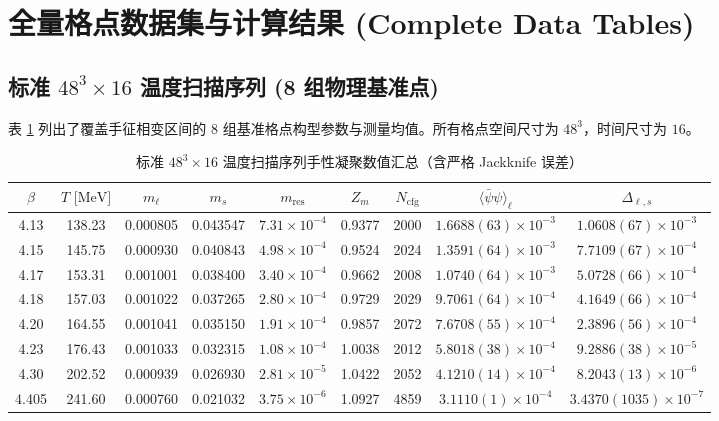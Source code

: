 \documentclass[11pt,a4paper]{ctexart}
\begin{document}
\section{全量格点数据集与计算结果 (Complete Data Tables)}

\subsection{\texorpdfstring{标准 $48^3 \times 16$ 温度扫描序列 (8 组物理基准点)}{标准 48^3 x 16 温度扫描序列 (8 组物理基准点)}}

表 \ref{tab:standard_ensembles} 列出了覆盖手征相变区间的 8 组基准格点构型参数与测量均值。所有格点空间尺寸为 $48^3$，时间尺寸为 $16$。

\begin{table}[H]
\centering
\footnotesize
\setlength{\tabcolsep}{3.5pt}
\caption{标准 $48^3 \times 16$ 温度扫描序列手性凝聚数值汇总（含严格 Jackknife 误差）}
\label{tab:standard_ensembles}
\begin{tabular}{ccccccccc}
\toprule
$\beta$ & $T\text{ [MeV]}$ & $m_\ell$ & $m_s$ & $m_{\text{res}}$ & $Z_m$ & $N_{\text{cfg}}$ & $\langle\bar{\psi}\psi\rangle_\ell$ & $\Delta_{\ell, s}$ \\
\midrule
4.13  & 138.23 & 0.000805 & 0.043547 & $7.31 \times 10^{-4}$ & 0.9377 & 2000 & $1.6688(63) \times 10^{-3}$ & $1.0608(67) \times 10^{-3}$ \\
4.15  & 145.75 & 0.000930 & 0.040843 & $4.98 \times 10^{-4}$ & 0.9524 & 2024 & $1.3591(64) \times 10^{-3}$ & $7.7109(67) \times 10^{-4}$ \\
4.17  & 153.31 & 0.001001 & 0.038400 & $3.40 \times 10^{-4}$ & 0.9662 & 2008 & $1.0740(64) \times 10^{-3}$ & $5.0728(66) \times 10^{-4}$ \\
4.18  & 157.03 & 0.001022 & 0.037265 & $2.80 \times 10^{-4}$ & 0.9729 & 2029 & $9.7061(64) \times 10^{-4}$ & $4.1649(66) \times 10^{-4}$ \\
4.20  & 164.55 & 0.001041 & 0.035150 & $1.91 \times 10^{-4}$ & 0.9857 & 2072 & $7.6708(55) \times 10^{-4}$ & $2.3896(56) \times 10^{-4}$ \\
4.23  & 176.43 & 0.001033 & 0.032315 & $1.08 \times 10^{-4}$ & 1.0038 & 2012 & $5.8018(38) \times 10^{-4}$ & $9.2886(38) \times 10^{-5}$ \\
4.30  & 202.52 & 0.000939 & 0.026930 & $2.81 \times 10^{-5}$ & 1.0422 & 2052 & $4.1210(14) \times 10^{-4}$ & $8.2043(13) \times 10^{-6}$ \\
4.405 & 241.60 & 0.000760 & 0.021032 & $3.75 \times 10^{-6}$ & 1.0927 & 4859 & $3.1110(1) \times 10^{-4}$  & $3.4370(1035) \times 10^{-7}$ \\
\bottomrule
\end{tabular}
\end{table}
\end{document}
